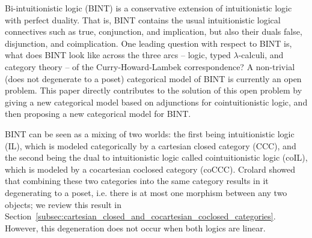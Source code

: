 Bi-intuitionistic logic (BINT) is a conservative extension of
intuitionistic logic with perfect duality.  That is, BINT contains the
usual intuitionistic logical connectives such as true, conjunction,
and implication, but also their duals false, disjunction, and
coimplication. One leading question with respect to BINT is, what does
BINT look like across the three arcs -- logic, typed
$\lambda$-calculi, and category theory -- of the Curry-Howard-Lambek
correspondence?  A non-trivial (does not degenerate to a poset)
categorical model of BINT is currently an open problem.  This paper
directly contributes to the solution of this open problem by giving a
new categorical model based on adjunctions for cointuitionistic logic,
and then proposing a new categorical model for BINT.  

BINT can be seen as a mixing of two worlds: the first being
intuitionistic logic (IL), which is modeled categorically by a
cartesian closed category (CCC), and the second being the dual to
intuitionistic logic called cointuitionistic logic (coIL), which is
modeled by a cocartesian coclosed category (coCCC).  Crolard
\cite{Crolard:2001} showed that combining these two categories into
the same category results in it degenerating to a poset, i.e.
there is at most one morphism between any two objects; we review this
result in
Section~\ref{subsec:cartesian_closed_and_cocartesian_coclosed_categories}.
However, this degeneration does not occur when both logics are linear.

